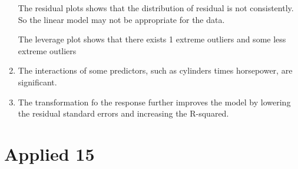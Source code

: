\documentclass{article}
\begin{document}
\begin{enumerate}[label=(\alph*)]
    The residual plots shows that the distribution of residual is not consistently. So the linear model may not be appropriate for the data.

    The leverage plot shows that there exists 1 extreme outliers and some less extreme outliers

  \item
    The interactions of some predictors, such as cylinders times horsepower, are significant.

  \item
    The transformation fo the response further improves the model by lowering the residual standard errors and increasing the R-squared.

\end{enumerate}
\newpage

\section*{Applied 15}
\inputminted{r}{q15.R}
\end{document}
